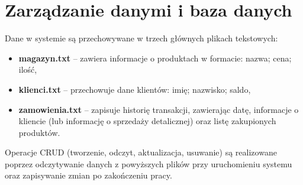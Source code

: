 \section{Zarządzanie danymi i baza danych}
Dane w systemie są przechowywane w trzech głównych plikach tekstowych:
\begin{itemize}
    \item \textbf{magazyn.txt} – zawiera informacje o produktach w formacie: nazwa; cena; ilość,
    \item \textbf{klienci.txt} – przechowuje dane klientów: imię; nazwisko; saldo,
    \item \textbf{zamowienia.txt} – zapisuje historię transakcji, zawierając datę, informacje o kliencie (lub informację o sprzedaży detalicznej) oraz listę zakupionych produktów.
\end{itemize}
Operacje CRUD (tworzenie, odczyt, aktualizacja, usuwanie) są realizowane poprzez odczytywanie danych z powyższych plików przy uruchomieniu systemu oraz zapisywanie zmian po zakończeniu pracy.


